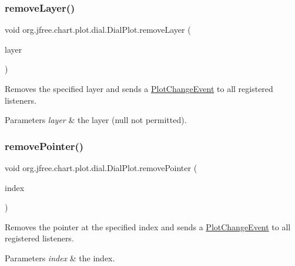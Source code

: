 \subsubsection{\texorpdfstring{remove\+Layer()}{removeLayer()}\hspace{0.1cm}{\footnotesize\ttfamily [2/2]}}
{\footnotesize\ttfamily void org.\+jfree.\+chart.\+plot.\+dial.\+Dial\+Plot.\+remove\+Layer (\begin{DoxyParamCaption}\item[{\mbox{\hyperlink{interfaceorg_1_1jfree_1_1chart_1_1plot_1_1dial_1_1_dial_layer}{Dial\+Layer}}}]{layer }\end{DoxyParamCaption})}

Removes the specified layer and sends a \mbox{\hyperlink{}{Plot\+Change\+Event}} to all registered listeners.


\begin{DoxyParams}{Parameters}
{\em layer} & the layer ({\ttfamily null} not permitted). \\
\hline
\end{DoxyParams}
\mbox{\label{classorg_1_1jfree_1_1chart_1_1plot_1_1dial_1_1_dial_plot_adb34f072b32074b4699a4721589e8d30}} 
\subsubsection{\texorpdfstring{remove\+Pointer()}{removePointer()}\hspace{0.1cm}{\footnotesize\ttfamily [1/2]}}
{\footnotesize\ttfamily void org.\+jfree.\+chart.\+plot.\+dial.\+Dial\+Plot.\+remove\+Pointer (\begin{DoxyParamCaption}\item[{int}]{index }\end{DoxyParamCaption})}

Removes the pointer at the specified index and sends a \mbox{\hyperlink{}{Plot\+Change\+Event}} to all registered listeners.


\begin{DoxyParams}{Parameters}
{\em index} & the index. \\
\hline
\end{DoxyParams}
\mbox{\label{classorg_1_1jfree_1_1chart_1_1plot_1_1dial_1_1_dial_plot_af453a3f4e83ec6443c5839bbedea0b0b}} 
